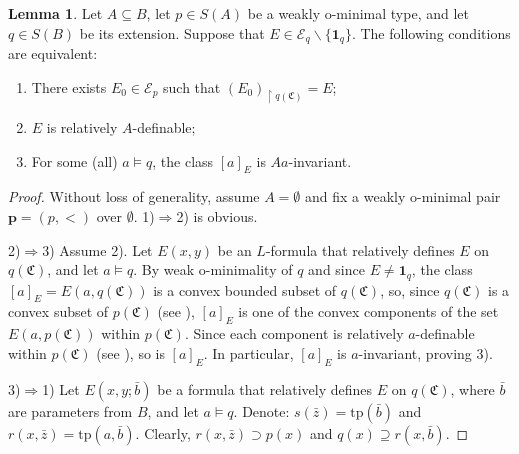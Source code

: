 \documentclass{amsart}
\theoremstyle{definition}
\newtheorem{Lemma}[Theorem]{Lemma}
\theoremstyle{definition}
\def\strok{\restriction}
\newcommand{\Mon}{\mathfrak C}
\newcommand{\tp}{\mathrm{tp}}
\begin{document}
\begin{Lemma}\label{Lemma O EKVIVALENCIJAMA}
Let $A\subseteq B$, let $p\in S(A)$ be a weakly o-minimal type, and let $q\in S(B)$ be its extension. Suppose that $E\in\mathcal E_q\smallsetminus\{\mathbf 1_q\}$. The following conditions are equivalent:
\begin{enumerate}[\hspace{10pt}1)]
\item There exists $E_0\in\mathcal E_p$ such that $(E_{0})_{\strok q(\Mon)}= E$;
\item $E$ is relatively $A$-definable;
\item For some (all) $a\models q$, the class $[a]_E$ is $Aa$-invariant.
\end{enumerate}
\end{Lemma}
\begin{proof} Without loss of generality, assume $A=\emptyset$ and fix a weakly o-minimal pair $\mathbf p=(p,<)$ over $\emptyset$. 
1)$\Rightarrow$2) is obvious. 

2)$\Rightarrow$3) Assume 2). Let $E(x,y)$ be an $L$-formula that relatively defines $E$ on $q(\Mon)$, and let $a\models q$. By weak o-minimality of $q$ and since $E\neq\mathbf 1_q$, the class $[a]_E= E(a,q(\Mon))$ is a convex bounded subset of $q(\Mon)$, so, since $q(\Mon)$ is a convex subset of $p(\Mon)$ (see \cite[Lemma 3.6(ii)]{MTwom}), $[a]_E$ is one of the convex components of the set $E(a,p(\Mon))$ within $p(\Mon)$. Since each component is relatively $a$-definable within $p(\Mon)$ (see \cite[Lemma 3.6(i)]{MTwom}), so is $[a]_E$. In particular, $[a]_E$ is $a$-invariant, proving 3). 

3)$\Rightarrow$1)
Let $E(x,y;\bar b)$ be a formula that relatively defines $E$ on $q(\Mon)$, where $\bar b$ are parameters from $B$, and let $a\models q$. Denote:  $s(\bar z)=\tp(\bar b)$ and $r(x,\bar z)=\tp(a,\bar b)$. Clearly, $r(x,\bar z)\supset p(x)$ and $q(x)\supseteq r(x,\bar b)$.  


\end{proof}
\end{document}
